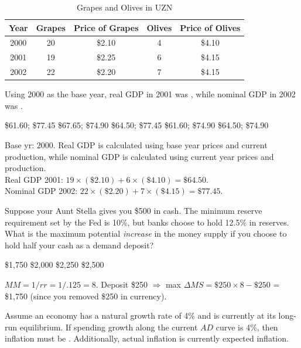 \documentclass[addpoints,11pt]{exam}
\theoremstyle{definition}
\newcommand{\blank}[0]{\underline{\hspace{3cm}}}
\begin{document}
\begin{questions}
	\begin{table}[h!]
		\caption{Grapes and Olives in UZN}
		\centering
		\begin{tabular}{c|c|c|c|c}
			Year & Grapes  & Price of Grapes & Olives  & Price of Olives \\
			\hline
			2000 & 20 & \$2.10 & 4 & \$4.10\\
			2001 & 19 & \$2.25 & 6 & \$4.15\\
			2002 & 22 & \$2.20 & 7 & \$4.15\\
		\end{tabular} 
		\label{MC23}
	\end{table}
	
	Using 2000 as the base year, real GDP in 2001 was \blank, while nominal GDP in 2002 was \blank.
	
	\begin{choices}
		\choice \$61.60; \$77.45
		\choice \$67.65; \$74.90
		\CorrectChoice \$64.50; \$77.45
		\choice \$61.60; \$74.90
		\choice \$64.50; \$74.90
	\end{choices}
	
\begin{solution}
Base yr: 2000. Real GDP is calculated using base year prices and current production, while nominal GDP is calculated using current year prices and production.\\
Real GDP 2001: $19\times(\$2.10) + 6\times(\$4.10) = \$64.50$.\\
Nominal GDP 2002: $22\times(\$2.20)+7\times(\$4.15) = \$77.45 $.
\end{solution}

\question Suppose your Aunt Stella gives you \$500 in cash. The minimum reserve requirement set by the Fed is 10\%, but banks choose to hold 12.5\% in reserves. What is the maximum potential \textit{increase} in the money supply if you choose to hold half your cash as a demand deposit?

\begin{choices}
\CorrectChoice \$1,750
\choice \$2,000
\choice \$2,250
\choice \$2,500	
\end{choices}

\begin{solution}
$MM = 1/rr = 1/.125 = 8$. Deposit \$250 $\Rightarrow$ max $\Delta MS = \$250\times 8 - \$250$ = \$1,750 (since you removed \$250 in currency).
\end{solution}

\question Assume an economy has a natural growth rate of 4\% and is currently at its long-run equilibrium. If spending growth along the current $AD$ curve is 4\%, then inflation must be \blank. Additionally, actual inflation is currently \blank expected inflation.


\end{questions}
\end{document}
